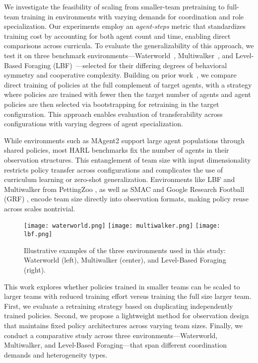 We investigate the feasibility of scaling from smaller-team pretraining to full-team 
training in environments with varying demands for coordination and role specialization.
Our experiments employ an \emph{agent-steps} metric that standardizes training cost by 
accounting for both agent count and time, enabling direct comparisons across curricula. 
To evaluate the generalizability of this approach, we test it on three benchmark 
environments—Waterworld~\cite{gupta2017}, Multiwalker~\cite{gupta2017}, 
and Level-Based Foraging (LBF)~\cite{papoudakis2021}—selected for their 
differing degrees of behavioral symmetry and cooperative complexity. 
Building on prior work~\cite{smit2023}, we compare 
direct training of policies at the full complement of target agents, with a strategy 
where policies are trained with fewer then the target number of agents and agent 
policies are then selected via bootstrapping for retraining in the target configuration.
This approach enables evaluation of transferability across configurations with 
varying degrees of agent specialization.

While environments such as MAgent2 \cite{zheng2017} support large agent populations through 
shared policies, most HARL benchmarks fix the number of agents in their observation structures. 
This entanglement of team size with input dimensionality restricts policy transfer across 
configurations and complicates the use of curriculum learning or zero-shot generalization. 
Environments like LBF and Multiwalker from PettingZoo \cite{terry2021}, as well as 
SMAC \cite{samvelyan2019} and Google Research Football (GRF) \cite{kurach2020}, 
encode team size directly into observation formats, making policy reuse across scales nontrivial.

\begin{figure}[ht]
    \centering
    \texttt{[image: waterworld.png]}
    \hfill
    \texttt{[image: multiwalker.png]}
    \hfill
    \texttt{[image: lbf.png]}
    \caption{Illustrative examples of the three environments used in this study: 
        Waterworld (left), Multiwalker (center), and Level-Based Foraging (right).}
    \label{fig:envs-overview}
\end{figure}

This work explores whether policies trained in smaller teams can be scaled to larger teams 
with reduced training effort versus training the full size larger team. First, 
we evaluate a retraining strategy based on duplicating independently trained policies. 
Second, we propose a lightweight method for observation design that maintains fixed policy 
architectures across varying team sizes. Finally, we conduct a comparative study across 
three environments—Waterworld, Multiwalker, and Level-Based Foraging—that span different 
coordination demands and heterogeneity types.

